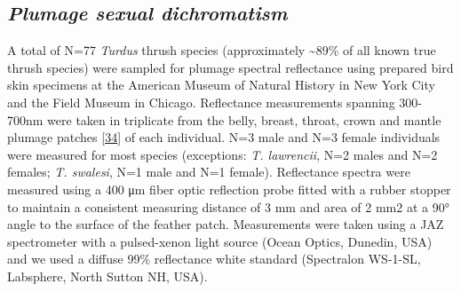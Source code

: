 \documentclass[
  a4paper,
]{article}
\begin{document}
\hypertarget{plumage-sexual-dichromatism}{%
\subsection{\texorpdfstring{\emph{Plumage sexual
dichromatism}}{Plumage sexual dichromatism}}\label{plumage-sexual-dichromatism}}

A total of N=77 \emph{Turdus} thrush species (approximately
\textasciitilde89\% of all known true thrush species) were sampled for
plumage spectral reflectance using prepared bird skin specimens at the
American Museum of Natural History in New York City and the Field Museum
in Chicago. Reflectance measurements spanning 300-700nm were taken in
triplicate from the belly, breast, throat, crown and mantle plumage
patches {[}\protect\hyperlink{ref-andersson2006}{34}{]} of each
individual. N=3 male and N=3 female individuals were measured for most
species (exceptions: \emph{T. lawrencii}, N=2 males and N=2 females;
\emph{T. swalesi}, N=1 male and N=1 female). Reflectance spectra were
measured using a 400 μm fiber optic reflection probe fitted with a
rubber stopper to maintain a consistent measuring distance of 3 mm and
area of 2 mm2 at a 90° angle to the surface of the feather patch.
Measurements were taken using a JAZ spectrometer with a pulsed-xenon
light source (Ocean Optics, Dunedin, USA) and we used a diffuse 99\%
reflectance white standard (Spectralon WS-1-SL, Labsphere, North Sutton
NH, USA).
\end{document}
